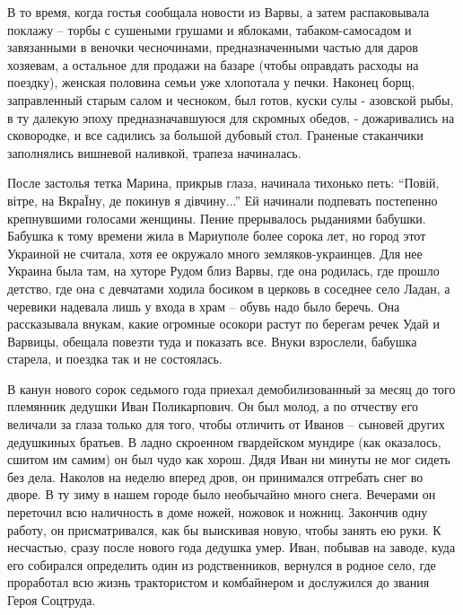 В то время, когда гостья сообщала новости из Варвы, а затем распаковывала
поклажу – торбы с сушеными грушами и яблоками, табаком-самосадом и завязанными
в веночки чесночинами, предназначенными частью для даров хозяевам, а остальное
для продажи на базаре (чтобы оправдать расходы на поездку), женская половина
семьи уже хлопотала у печки. Наконец борщ, заправленный старым салом и
чесноком, был готов, куски сулы - азовской рыбы, в ту далекую эпоху
предназначавшуюся для скромных обедов, -  дожаривались на сковородке, и все
садились за большой дубовый стол. Граненые стаканчики заполнялись вишневой
наливкой, трапеза начиналась.

После застолья тетка Марина, прикрыв глаза, начинала тихонько петь: \enquote{Повій,
вітре, на ВкраЇну, де покинув я дівчину...} Ей начинали подпевать постепенно
крепнувшими голосами женщины. Пение прерывалось рыданиями бабушки. Бабушка к
тому времени жила в Мариуполе более сорока лет, но город этот Украиной не
считала, хотя ее окружало много земляков-украинцев. Для нее Украина была там,
на хуторе Рудом близ Варвы, где она родилась, где прошло детство, где она с
девчатами ходила босиком в церковь в соседнее село Ладан, а черевики надевала
лишь у входа в храм – обувь надо было беречь. Она рассказывала внукам, какие
огромные осокори растут по берегам речек Удай и Варвицы, обещала повезти туда и
показать все. Внуки взрослели, бабушка старела, и поездка так и не состоялась.

В канун нового сорок седьмого года приехал демобилизованный за месяц до того
племянник дедушки Иван Поликарпович. Он был молод, а по отчеству его величали
за глаза только для того, чтобы отличить от Иванов – сыновей других дедушкиных
братьев. В ладно скроенном гвардейском мундире (как оказалось, сшитом им самим)
он был чудо как хорош. Дядя Иван ни минуты не мог сидеть без дела. Наколов на
неделю вперед дров, он принимался отгребать снег во дворе. В ту зиму в нашем
городе было необычайно много снега. Вечерами он переточил всю наличность в доме
ножей, ножовок и ножниц. Закончив одну работу, он присматривался, как бы
выискивая новую, чтобы занять ею руки. К несчастью, сразу после нового года
дедушка умер. Иван, побывав на заводе, куда его собирался определить один из
родственников, вернулся в родное село, где проработал всю жизнь трактористом и
комбайнером и дослужился до звания Героя Соцтруда.

